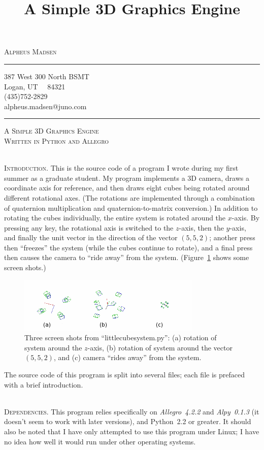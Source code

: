 \documentclass[12pt]{article}
\title{A Simple 3D Graphics Engine}
\author{\headerstuff}
\date{}
\makeatletter
\newcommand{\titleize}[1]{
   \begin{center}
       \Large \textsc{#1} \normalsize \\
   \end{center}
}
\newcommand{\normaltitleize}[1]{\mbox{}\\ \textsc{#1} \normalsize}
\newcommand{\headerstuff}{
   \begin{center}
   \textsc{\Large{Alpheus Madsen}}

   \rule{1in}{.01in}

   387 West 300 North BSMT \\

   Logan, UT \ \ 84321  \\

   (435)752-2829 \\

   alpheus.madsen@juno.com

   \rule{2in}{.01in}
   \end{center}
}
\makeatother
\begin{document}

\headerstuff

\titleize{A Simple 3D Graphics Engine\\Written in Python and Allegro}

\normaltitleize{Introduction.}  This is the source code of a program I wrote during my first summer as a graduate student.  My program implements a 3D camera, draws a coordinate axis for reference, and then draws eight cubes being rotated around different rotational axes.  (The rotations are implemented through a combination of quaternion multiplication and quaternion-to-matrix conversion.)  In addition to rotating the cubes individually, the entire system is rotated around the $x$-axis.  By pressing any key, the rotational axis is switched to the $z$-axis, then the $y$-axis, and finally the unit vector in the direction of the vector $(5, 5, 2)$; another press then ``freezes'' the system (while the cubes continue to rotate), and a final press then causes the camera to ``ride away'' from the system.  (Figure~\ref{screenshots} shows some screen shots.)

\begin{figure}[!hbtp]
   \includegraphics{screenshots4.png}
\caption{Three screen shots from ``littlecubesystem.py'': (a) rotation of system around the $z$-axis, (b) rotation of system around the vector $(5, 5, 2)$, and (c) camera ``rides away'' from the system.}\label{screenshots}
\end{figure}

The source code of this program is split into several files; each file is prefaced with a brief introduction.

\normaltitleize{Dependencies.}  This program relies specifically on \emph{Allegro~4.2.2} and \emph{Alpy~0.1.3} (it doesn't seem to work with later versions), and Python~2.2 or greater.  It should also be noted that I have only attempted to use this program under Linux; I have no idea how well it would run under other operating systems.
\end{document}
